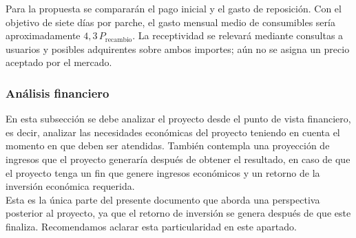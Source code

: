 Para la propuesta se compararán el pago inicial y el gasto de reposición. Con el objetivo de siete días por parche, el gasto mensual medio de consumibles sería aproximadamente $4{,}3\,P_{\mathrm{recambio}}$. La receptividad se relevará mediante consultas a usuarios y posibles adquirentes sobre ambos importes; aún no se asigna un precio aceptado por el mercado.

\subsubsection{Análisis financiero}
{\consigna
En esta subsección se debe analizar el proyecto desde el punto de vista financiero, es decir, analizar las necesidades económicas del proyecto teniendo en cuenta el momento en que deben ser atendidas. También contempla una proyección de ingresos que el proyecto generaría después de obtener el resultado, en caso de que el proyecto tenga un fin que genere ingresos económicos y un retorno de la inversión económica requerida.\\
Esta es la única parte del presente documento que aborda una perspectiva posterior al proyecto, ya que el retorno de inversión se genera después de que este finaliza. Recomendamos aclarar esta particularidad en este apartado.
}


